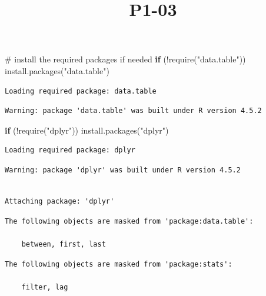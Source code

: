 \documentclass[
  letterpaper,
  DIV=11,
  numbers=noendperiod]{scrartcl}
\title{P1-03}
\author{}
\date{}
\newenvironment{Shaded}{\begin{snugshade}}{\end{snugshade}}
\newcommand{\CommentTok}[1]{\textcolor[rgb]{0.37,0.37,0.37}{#1}}
\newcommand{\ControlFlowTok}[1]{\textcolor[rgb]{0.00,0.23,0.31}{\textbf{#1}}}
\newcommand{\FunctionTok}[1]{\textcolor[rgb]{0.28,0.35,0.67}{#1}}
\newcommand{\NormalTok}[1]{\textcolor[rgb]{0.00,0.23,0.31}{#1}}
\newcommand{\SpecialCharTok}[1]{\textcolor[rgb]{0.37,0.37,0.37}{#1}}
\newcommand{\StringTok}[1]{\textcolor[rgb]{0.13,0.47,0.30}{#1}}
\begin{document}
\maketitle


\begin{Shaded}
\begin{Highlighting}[]
\CommentTok{\# install the required packages if needed}
\ControlFlowTok{if}\NormalTok{ (}\SpecialCharTok{!}\FunctionTok{require}\NormalTok{(}\StringTok{"data.table"}\NormalTok{)) }\FunctionTok{install.packages}\NormalTok{(}\StringTok{"data.table"}\NormalTok{)}
\end{Highlighting}
\end{Shaded}

\begin{verbatim}
Loading required package: data.table
\end{verbatim}

\begin{verbatim}
Warning: package 'data.table' was built under R version 4.5.2
\end{verbatim}

\begin{Shaded}
\begin{Highlighting}[]
\ControlFlowTok{if}\NormalTok{ (}\SpecialCharTok{!}\FunctionTok{require}\NormalTok{(}\StringTok{"dplyr"}\NormalTok{)) }\FunctionTok{install.packages}\NormalTok{(}\StringTok{"dplyr"}\NormalTok{)}
\end{Highlighting}
\end{Shaded}

\begin{verbatim}
Loading required package: dplyr
\end{verbatim}

\begin{verbatim}
Warning: package 'dplyr' was built under R version 4.5.2
\end{verbatim}

\begin{verbatim}

Attaching package: 'dplyr'
\end{verbatim}

\begin{verbatim}
The following objects are masked from 'package:data.table':

    between, first, last
\end{verbatim}

\begin{verbatim}
The following objects are masked from 'package:stats':

    filter, lag
\end{verbatim}
\end{document}
